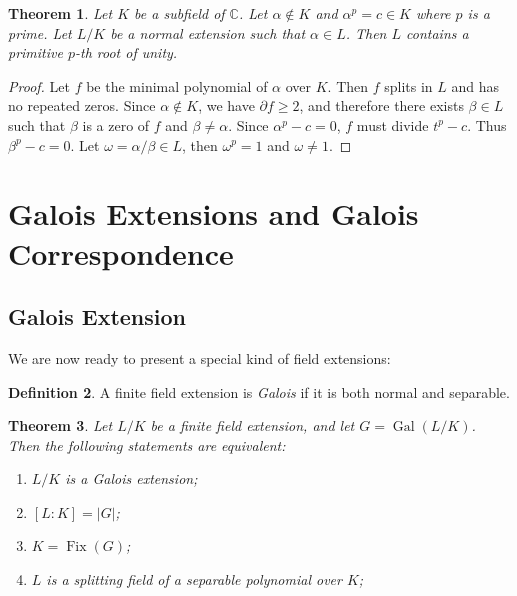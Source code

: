\documentclass[12pt]{article}
\newtheorem{theorem}{Theorem}
\theoremstyle{definition}
\newtheorem{definition}[theorem]{Definition}
\newcommand{\Gal}{\operatorname{Gal}}
\newcommand{\Fix}{\operatorname{Fix}}
\begin{document}
\begin{theorem} \label{thm:unity-3}
	Let $K$ be a subfield of $\mathbb C$. Let $\alpha \notin K$ and $\alpha^p = c \in K$ where $p$ is a prime. Let $L / K$ be a normal extension such that $\alpha \in L$. Then $L$ contains a primitive $p$-th root of unity.
\end{theorem}

\begin{proof}
	Let $f$ be the minimal polynomial of $\alpha$ over $K$. Then $f$ splits in $L$ and has no repeated zeros. Since $\alpha \notin K$, we have $\partial f \ge 2$, and therefore there exists $\beta \in L$ such that $\beta$ is a zero of $f$ and $\beta \neq \alpha$. Since $\alpha ^ p - c = 0$, $f$ must divide $t ^ p - c$. Thus $\beta^p - c = 0$. Let $\omega=\alpha / \beta \in L $, then $\omega^p=1$ and $\omega \neq 1$.
\end{proof}

\section{Galois Extensions and Galois Correspondence}

\subsection{Galois Extension}


We are now ready to present a special kind of field extensions:

\begin{definition}
    A finite field extension is \textit{Galois} if it is both normal and separable. 
\end{definition}


\begin{theorem} \label{thm:fixed}
	Let $L/K$ be a finite field extension, and let $G = \Gal(L/K)$. Then the following statements are equivalent:
	\begin{enumerate}[label=(\roman*)]
		\item $L/K$ is a Galois extension;
		\item $[L:K] = |G|$;
		\item $K = \Fix(G)$;
		\item $L$ is a splitting field of a separable polynomial over $K$;
	\end{enumerate}
\end{theorem}
\end{document}
